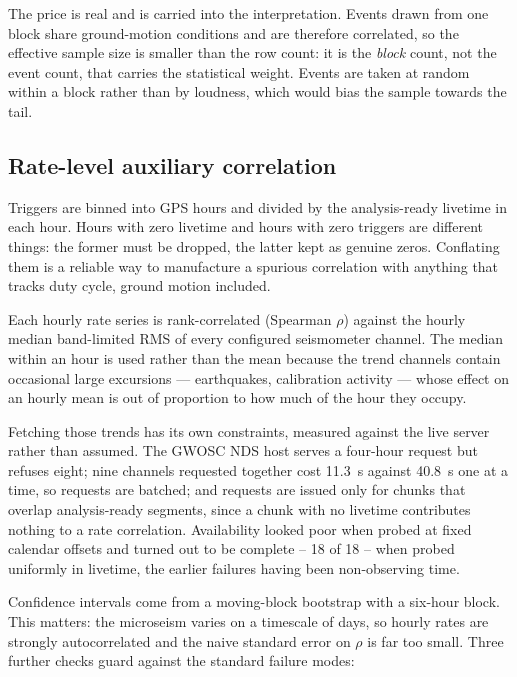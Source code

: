 The price is real and is carried into the interpretation. Events drawn from
one block share ground-motion conditions and are therefore correlated, so the
effective sample size is smaller than the row count: it is the \emph{block}
count, not the event count, that carries the statistical weight. Events are
taken at random within a block rather than by loudness, which would bias the
sample towards the tail.

\subsection{Rate-level auxiliary correlation}
\label{sec:methods:ratecorr}

Triggers are binned into GPS hours and divided by the analysis-ready livetime
in each hour. Hours with zero livetime and hours with zero triggers are
different things: the former must be dropped, the latter kept as genuine
zeros. Conflating them is a reliable way to manufacture a spurious correlation
with anything that tracks duty cycle, ground motion included.

Each hourly rate series is rank-correlated (Spearman $\rho$) against the
hourly median band-limited RMS of every configured seismometer channel. The
median within an hour is used rather than the mean because the trend channels
contain occasional large excursions --- earthquakes, calibration activity ---
whose effect on an hourly mean is out of proportion to how much of the hour
they occupy.

Fetching those trends has its own constraints, measured against the live
server rather than assumed. The GWOSC NDS host serves a four-hour request but
refuses eight; nine channels requested together cost \SI{11.3}{\second}
against \SI{40.8}{\second} one at a time, so requests are batched; and
requests are issued only for chunks that overlap analysis-ready segments,
since a chunk with no livetime contributes nothing to a rate correlation.
Availability looked poor when probed at fixed calendar offsets and turned out
to be complete -- 18 of 18 -- when probed uniformly in livetime, the earlier
failures having been non-observing time.

Confidence intervals come from a moving-block bootstrap
\citep{Kunsch1989} with a six-hour block. This matters: the microseism varies
on a timescale of days, so hourly rates are strongly autocorrelated and the
naive standard error on $\rho$ is far too small. Three further checks guard
against the standard failure modes:

